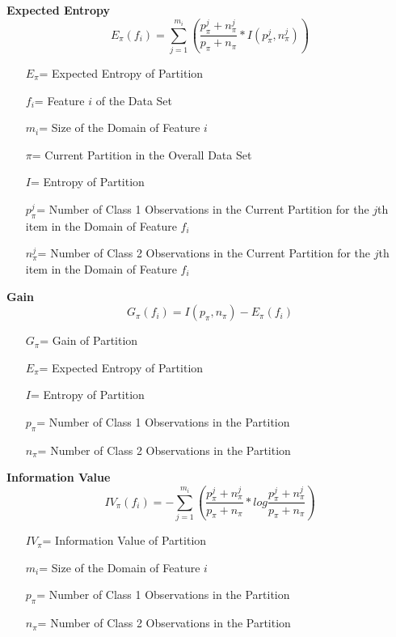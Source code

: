 \documentclass[twoside,11pt]{article}
\begin{document}
\textbf{Expected Entropy}
\begin{equation}
	E_\pi(f_i) = \sum_{j=1}^{m_i}(\frac{p_\pi^j + n_\pi^j}{p_\pi + n_\pi} * I(p_\pi^j, n_\pi^j))
\end{equation}
\begin{itemize}
	\item[$E_\pi$=] Expected Entropy of Partition
	\item[$f_i$=] Feature $i$ of the Data Set
	\item[$m_i$=] Size of the Domain of Feature $i$
	\item[$\pi$=] Current Partition in the Overall Data Set
	\item[$I$=] Entropy of Partition
	\item[$p_\pi^j$=] Number of Class 1 Observations in the Current Partition for the $j$th item in the Domain of Feature $f_i$
	\item[$n_\pi^j$=] Number of Class 2 Observations in the Current Partition for the $j$th item in the Domain of Feature $f_i$
\end{itemize}

\textbf{Gain}
\begin{equation}
	G_\pi(f_i)  = I(p_\pi, n_\pi) - E_\pi(f_i)
\end{equation}
\begin{itemize}
	\item[$G_\pi$=] Gain of Partition
	\item[$E_\pi$=] Expected Entropy of Partition
	\item[$I$=] Entropy of Partition
	\item[$p_\pi$=] Number of Class 1 Observations in the Partition
	\item[$n_\pi$=] Number of Class 2 Observations in the Partition
\end{itemize}
\newpage

\textbf{Information Value}
\begin{equation}
	IV_\pi(f_i)  = -\sum_{j=1}^{m_i}(\frac{p_\pi^j + n_\pi^j}{p_\pi + n_\pi} * log\frac{p_\pi^j + n_\pi^j}{p_\pi + n_\pi})
\end{equation}
\begin{itemize}
	\item[$IV_\pi$=] Information Value of Partition
	\item[$m_i$=] Size of the Domain of Feature $i$
	\item[$p_\pi$=] Number of Class 1 Observations in the Partition
	\item[$n_\pi$=] Number of Class 2 Observations in the Partition
\end{itemize}
\end{document}
